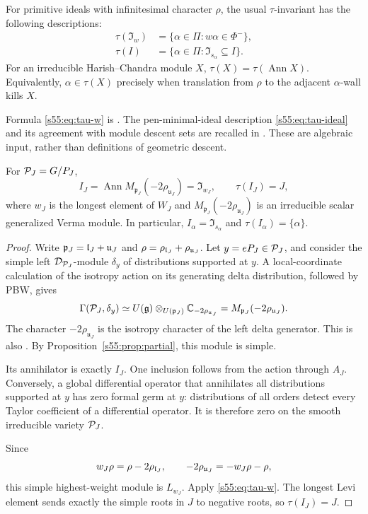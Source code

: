 \begin{thm}
\label{s55:thm:tau-input}
For primitive ideals with infinitesimal character $\rho$, the usual
$\tau$-invariant has the following descriptions:
\begin{align}
 \tau(\mathfrak I_w)
   &=\{\alpha\in\Pi:w\alpha\in\Phi^-\},
   \label{s55:eq:tau-w}\\
 \tau(I)
   &=\{\alpha\in\Pi:\mathfrak I_{s_\alpha}\subseteq I\}.
   \label{s55:eq:tau-ideal}
\end{align}
For an irreducible Harish--Chandra module $X$,
$\tau(X)=\tau(\operatorname{Ann}X)$. Equivalently,
$\alpha\in\tau(X)$ precisely when translation from $\rho$ to the
adjacent $\alpha$-wall kills $X$.
\end{thm}

Formula \eqref{s55:eq:tau-w} is \cite[Section 3, (3.4)--(3.5)]{BV85}.
The pen-minimal-ideal description \eqref{s55:eq:tau-ideal} and its agreement
with module descent sets are recalled in
\cite[Section 6.3, Definition 6.8 and Theorem 6.9]{Binegar08}.
These are algebraic input, rather than definitions of geometric descent.

\begin{prop}
\label{s55:prop:parabolic-tau}
For $\mathcal{P}_J=G/P_J$,
\[
  I_J=\operatorname{Ann}M_{\mathfrak p_J}(-2\rho_{\mathfrak u_J})
      =\mathfrak I_{w_J},
  \qquad
  \boxed{\tau(I_J)=J},
\]
where $w_J$ is the longest element of $W_J$ and
$M_{\mathfrak p_J}(-2\rho_{\mathfrak u_J})$ is an irreducible scalar
generalized Verma module. In particular,
$I_\alpha=\mathfrak I_{s_\alpha}$ and $\tau(I_\alpha)=\{\alpha\}$.
\end{prop}

\begin{proof}
Write $\mathfrak p_J=\mathfrak{l}_J+\mathfrak u_J$ and
$\rho=\rho_{\mathfrak{l}_J}+\rho_{\mathfrak u_J}$.
Let $y=eP_J\in\mathcal{P}_J$, and consider the simple left $\mathcal D_{\mathcal{P}_J}$-module
$\delta_y$ of distributions supported at $y$. A local-coordinate
calculation of the isotropy action on its generating delta distribution,
followed by PBW, gives
\[
 \Gamma(\mathcal{P}_J,\delta_y)
   \simeq U(\mathfrak{g})\otimes_{U(\mathfrak p_J)}
                    \mathbb C_{-2\rho_{\mathfrak u_J}}
   =M_{\mathfrak p_J}(-2\rho_{\mathfrak u_J}).
\]
The character $-2\rho_{\mathfrak u_J}$ is the isotropy character of the
left delta generator. This is also
\cite[Propositions 2.32--2.33]{Yahiro17}. By
Proposition~\ref{s55:prop:partial}, this module is simple.

Its annihilator is exactly $I_J$. One inclusion follows from the action
through $A_J$. Conversely, a global differential operator that annihilates
all distributions supported at $y$ has zero formal germ at $y$: distributions
of all orders detect every Taylor coefficient of a differential operator.
It is therefore zero on the smooth irreducible variety $\mathcal{P}_J$.

Since
\[
 w_J\rho=\rho-2\rho_{\mathfrak{l}_J},
 \qquad
 -2\rho_{\mathfrak u_J}=-w_J\rho-\rho,
\]
this simple highest-weight module is $L_{w_J}$. Apply
\eqref{s55:eq:tau-w}. The longest Levi element sends exactly the simple roots
in $J$ to negative roots, so $\tau(I_J)=J$.
\end{proof}

